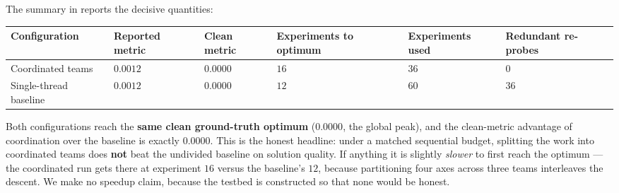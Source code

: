 \documentclass[
]{article}
\newcounter{none} %
\begin{document}
The summary in  reports the
decisive quantities:

{\def\LTcaptype{none} %
\begin{longtable}[]{@{}
  >{\raggedright\arraybackslash}p{}
  >{\raggedright\arraybackslash}p{}
  >{\raggedright\arraybackslash}p{}
  >{\raggedright\arraybackslash}p{}
  >{\raggedright\arraybackslash}p{}
  >{\raggedright\arraybackslash}p{}@{}}
\toprule\noalign{}
\begin{minipage}[b]{\linewidth}\raggedright
Configuration
\end{minipage} & \begin{minipage}[b]{\linewidth}\raggedright
Reported metric
\end{minipage} & \begin{minipage}[b]{\linewidth}\raggedright
Clean metric
\end{minipage} & \begin{minipage}[b]{\linewidth}\raggedright
Experiments to optimum
\end{minipage} & \begin{minipage}[b]{\linewidth}\raggedright
Experiments used
\end{minipage} & \begin{minipage}[b]{\linewidth}\raggedright
Redundant re-probes
\end{minipage} \\
\midrule\noalign{}
\endhead
\bottomrule\noalign{}
\endlastfoot
Coordinated teams & \(0.0012\) & \(0.0000\) & \(16\) & \(36\) & \(0\) \\
Single-thread baseline & \(0.0012\) & \(0.0000\) & \(12\) & \(60\) &
\(36\) \\
\end{longtable}
}

Both configurations reach the \textbf{same clean ground-truth optimum}
(\(0.0000\), the global peak), and the clean-metric advantage of
coordination over the baseline is exactly \(0.0000\). This is the honest
headline: under a matched sequential budget, splitting the work into
coordinated teams does \textbf{not} beat the undivided baseline on
solution quality. If anything it is slightly \emph{slower} to first
reach the optimum --- the coordinated run gets there at experiment
\(16\) versus the baseline's \(12\), because partitioning four axes
across three teams interleaves the descent. We make no speedup claim,
because the testbed is constructed so that none would be honest.
\end{document}
